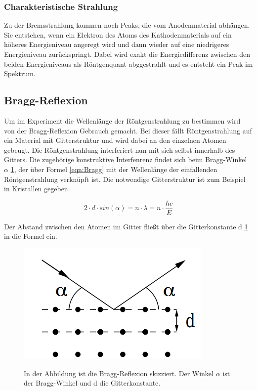 \documentclass[titlepage = firstcover]{scrartcl}
\begin{document}
            \subsubsection*{Charakteristische Strahlung}
                Zu der Bremsstrahlung kommen noch Peaks, die vom Anodenmaterial abhängen. Sie entstehen, wenn ein Elektron des Atoms des Kathodenmaterials 
                auf ein höheres Energieniveau angeregt wird und dann wieder auf eine niedrigeres Energieniveau zurückspringt. Dabei wird exakt die 
                Energiedifferenz zwischen den beiden Energieniveaus als Röntgenquant abggestrahlt und es entsteht ein Peak im Spektrum.
                
        \subsection{Bragg-Reflexion}
        Um im Experiment die Wellenlänge der Röntgenstrahlung zu bestimmen wird von der Bragg-Reflexion Gebrauch gemacht. Bei dieser fällt Röntgenstrahlung
        auf ein Material mit Gitterstruktur und wird dabei an den einzelnen Atomen gebeugt. Die Röntgenstrahlung interferiert nun mit sich selbst innerhalb 
        des Gitters. Die zugehörige konstruktive Interfenrenz findet sich beim Bragg-Winkel $\alpha $ \ref{fig:SkizzeBragg}, der über Formel \ref{eqn:Bragg} 
        mit der Wellenlänge der einfallenden Röntgenstrahlung verknüpft ist. Die notwendige Gitterstruktur ist zum Beispiel in Kristallen gegeben.

        \begin{equation}
            2 \cdot d \cdot sin(\alpha) = n \cdot \lambda = n \cdot \frac{hc}{E}
            \label{eqn:Bragg}
        \end{equation}

        \noindent
        Der Abstand zwischen den Atomen im Gitter fließt über die Gitterkonstante d \ref{fig:SkizzeBragg} in die Formel ein.
        
        \FloatBarrier
        \begin{figure}[h]
            \centering
            \caption{In der Abbildung ist die Bragg-Reflexion skizziert. Der Winkel $\alpha$ ist der Bragg-Winkel und d die Gitterkonstante.}
            \includegraphics{Bragg.png}
            \label{fig:SkizzeBragg}
        \end{figure}
        \FloatBarrier
\end{document}
